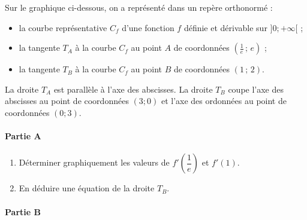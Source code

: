 \documentclass[11pt,fleqn, openany]{book} %
\begin{document}
\begin{exercise}[topic=cvx04, subtitle={(Sujet zéro 2021)}]

Sur le graphique ci-dessous, on a représenté dans un repère orthonormé :
\begin{itemize}
\item la courbe représentative $C_f$ d'une fonction $f$ définie et dérivable sur $]0 ; +\infty[$ ;
\item la tangente $T_A$ à la courbe $C_f$ au point $A$ de coordonnées $\left(\frac{1}{e}\,;\,e\right)$ ;
\item la tangente $T_B$ à la courbe $C_f$ au point $B$ de coordonnées $\left(1\,;\,2\right)$.\end{itemize}
La droite $T_A$ est parallèle à l'axe des abscisses. La droite $T_B$ coupe l'axe des abscisses au point de coordonnées $(3 ; 0)$ et l'axe des ordonnées au point de coordonnées $(0 ; 3)$.

\begin{center}
\end{center}

\paragraph{Partie A}

\begin{enumerate}
\item Déterminer graphiquement les valeurs de $f'\left(\dfrac{1}{e}\right)$ et $f'(1)$.
\item En déduire une équation de la droite $T_B$.
\end{enumerate}

\paragraph{Partie B}


\end{exercise}
\end{document}
